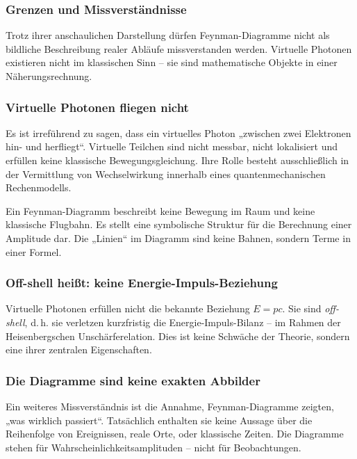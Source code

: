 \subsubsection{Grenzen und Missverständnisse}

Trotz ihrer anschaulichen Darstellung dürfen Feynman-Diagramme nicht als bildliche Beschreibung realer Abläufe missverstanden werden. Virtuelle Photonen existieren nicht im klassischen Sinn – sie sind mathematische Objekte in einer Näherungsrechnung.

\subsubsection*{Virtuelle Photonen fliegen nicht}
Es ist irreführend zu sagen, dass ein virtuelles Photon „zwischen zwei Elektronen hin- und herfliegt“. Virtuelle Teilchen sind nicht messbar, nicht lokalisiert und erfüllen keine klassische Bewegungsgleichung. Ihre Rolle besteht ausschließlich in der Vermittlung von Wechselwirkung innerhalb eines quantenmechanischen Rechenmodells.

\vspace{0.5em}
\begin{tcolorbox}[didaktikbox, title=Keine Teilchenbahn im Diagramm]
	\label{box: Keine Teilchenbahn im Diagramm}
	Ein Feynman-Diagramm beschreibt keine Bewegung im Raum und keine klassische Flugbahn. Es stellt eine symbolische Struktur für die Berechnung einer Amplitude dar. Die „Linien“ im Diagramm sind keine Bahnen, sondern Terme in einer Formel.
\end{tcolorbox}

\subsubsection*{Off-shell heißt: keine Energie-Impuls-Beziehung}
Virtuelle Photonen erfüllen nicht die bekannte Beziehung $E = pc$. Sie sind \emph{off-shell}, d.\,h. sie verletzen kurzfristig die Energie-Impuls-Bilanz – im Rahmen der Heisenbergschen Unschärferelation. Dies ist keine Schwäche der Theorie, sondern eine ihrer zentralen Eigenschaften.

\subsubsection*{Die Diagramme sind keine exakten Abbilder}
Ein weiteres Missverständnis ist die Annahme, Feynman-Diagramme zeigten, „was wirklich passiert“. Tatsächlich enthalten sie keine Aussage über die Reihenfolge von Ereignissen, reale Orte, oder klassische Zeiten. Die Diagramme stehen für Wahrscheinlichkeitsamplituden – nicht für Beobachtungen.


